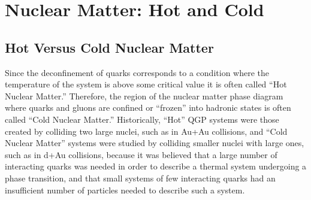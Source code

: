 

\chapter{Nuclear Matter: Hot and Cold} %
\section{Hot Versus Cold Nuclear Matter}
Since the deconfinement of quarks corresponds to a condition where the temperature of the system is above some critical value it is often called ``Hot Nuclear Matter.'' Therefore, the region of the nuclear matter phase diagram where quarks and gluons are confined or ``frozen'' into hadronic states is often called ``Cold Nuclear Matter.'' Historically, ``Hot'' QGP systems were those created by colliding two large nuclei, such as in Au+Au collisions, and ``Cold Nuclear Matter'' systems were studied by colliding smaller nuclei with large ones, such as in d+Au collisions, because it was believed that a large number of interacting quarks was needed in order to describe a thermal system undergoing a phase transition, and that small systems of few interacting quarks had an insufficient number of particles needed to describe such a system.

